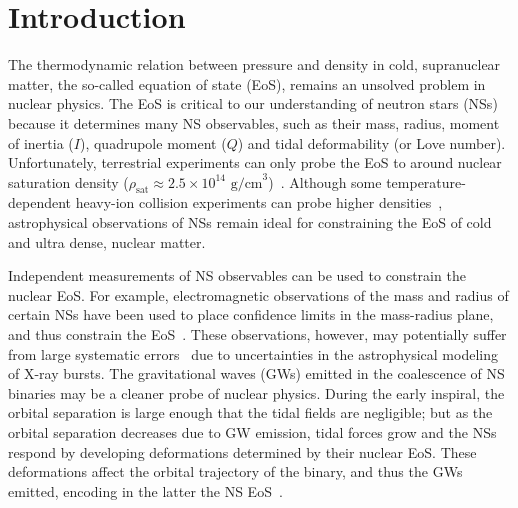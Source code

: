 \documentclass[prd,twocolumn,nofootinbib,superscriptaddress,amsmath,amssymb]{revtex4-1}
\begin{document}
\maketitle


\section{Introduction}
\label{sec:intro}

The thermodynamic relation between pressure and density in cold, supranuclear matter, the so-called equation of state (EoS), remains an unsolved problem in nuclear physics. The EoS is critical to our understanding of neutron stars (NSs) because it determines many NS observables, such as their mass, radius, moment of inertia ($I$), quadrupole moment ($Q$) and tidal deformability (or Love number). Unfortunately, terrestrial experiments can only probe the EoS to around nuclear saturation density ($\rho_{\text{sat}} \approx 2.5 \times 10^{14} \text{ g/cm}^3$)~\cite{Li:HeavyIon,Tsang:SymmetryEnergy,Centelles:NeutronSkin,Li:CrossSections,Chen:SymEnergy}. Although some temperature-dependent heavy-ion collision experiments can probe higher densities~\cite{Danielewicz:2002pu}, astrophysical observations of NSs remain ideal for constraining the EoS of cold and ultra dense, nuclear matter.

Independent measurements of NS observables can be used to constrain the nuclear EoS. For example, electromagnetic observations of the mass and radius of certain NSs have been used to place confidence limits in the mass-radius plane, and thus constrain the EoS~\cite{guver,ozel-baym-guver,steiner-lattimer-brown,Lattimer2014,Ozel:2016oaf}. These observations, however, may potentially suffer from large systematic errors~\cite{Miller2013} due to uncertainties in the astrophysical modeling of X-ray bursts. The gravitational waves (GWs) emitted in the coalescence of NS binaries may be a cleaner probe of nuclear physics. During the early inspiral, the orbital separation is large enough that the tidal fields are negligible; but as the orbital separation decreases due to GW emission, tidal forces grow and the NSs respond by developing deformations determined by their nuclear EoS. These deformations affect the orbital trajectory of the binary, and thus the GWs emitted, encoding in the latter the NS EoS~\cite{hinderer-love,Flanagan2008}.
\end{document}
